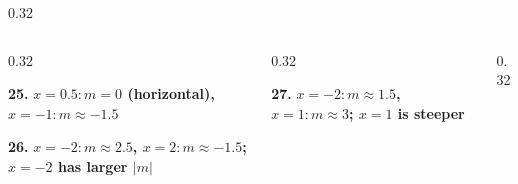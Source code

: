 \documentclass[aspectratio=169,12pt]{beamer}
\newcommand{\MMAnswer}[2]{\begin{MMAnswerCard}\raggedright\small\textbf{#1.} \textcolor{mmanswerColor}{\textbf{#2}}\par\end{MMAnswerCard}}
\begin{document}
\begin{frame}[t]
\begin{columns}[T,onlytextwidth]
\begin{column}{0.32\textwidth}
\end{column}
\end{columns}
\vspace{0.45em}
\begin{columns}[T,onlytextwidth]
\begin{column}{0.32\textwidth}
\MMAnswer{25}{$x=0.5\!: m=0$ (horizontal), $x=-1\!: m \approx -1.5$}\MMAnswer{26}{$x=-2\!: m \approx 2.5$, $x=2\!: m \approx -1.5$; $x=-2$ has larger $|m|$}
\end{column}
\begin{column}{0.32\textwidth}
\MMAnswer{27}{$x=-2\!: m \approx 1.5$, $x=1\!: m \approx 3$; $x=1$ is steeper}
\end{column}
\begin{column}{0.32\textwidth}
\end{column}
\end{columns}
\end{frame}
\end{document}
